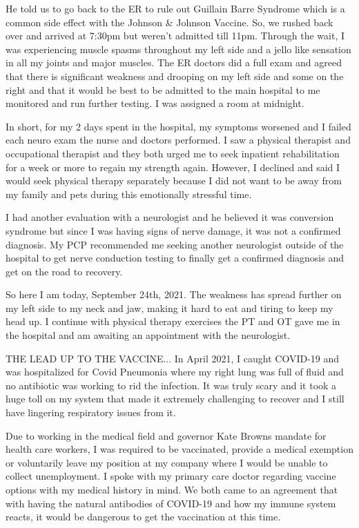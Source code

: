 He told us to go back to the ER to rule out Guillain Barre Syndrome which is a
common side effect with the Johnson \& Johnson Vaccine. So, we rushed back over
and arrived at 7:30pm but weren’t admitted till 11pm. Through the wait, I was
experiencing muscle spasms throughout my left side and a jello like sensation in
all my joints and major muscles. The ER doctors did a full exam and agreed that
there is significant weakness and drooping on my left side and some on the right
and that it would be best to be admitted to the main hospital to me monitored
and run further testing. I was assigned a room at midnight.

In short, for my 2 days spent in the hospital, my symptoms worsened and I failed
each neuro exam the nurse and doctors performed. I saw a physical therapist and
occupational therapist and they both urged me to seek inpatient rehabilitation
for a week or more to regain my strength again. However, I declined and said I
would seek physical therapy separately because I did not want to be away from my
family and pets during this emotionally stressful time.

I had another evaluation with a neurologist and he believed it was conversion
syndrome but since I was having signs of nerve damage, it was not a confirmed
diagnosis. My PCP recommended me seeking another neurologist outside of the
hospital to get nerve conduction testing to finally get a confirmed diagnosis
and get on the road to recovery.

So here I am today, September 24th, 2021. The weakness has spread further on my
left side to my neck and jaw, making it hard to eat and tiring to keep my head
up. I continue with physical therapy exercises the PT and OT gave me in the
hospital and am awaiting an appointment with the neurologist.

THE LEAD UP TO THE VACCINE... In April 2021, I caught COVID-19 and was
hospitalized for Covid Pneumonia where my right lung was full of fluid and no
antibiotic was working to rid the infection. It was truly scary and it took a
huge toll on my system that made it extremely challenging to recover and I still
have lingering respiratory issues from it.

Due to working in the medical field and governor Kate Browns mandate for health
care workers, I was required to be vaccinated, provide a medical exemption or
voluntarily leave my position at my company where I would be unable to collect
unemployment. I spoke with my primary care doctor regarding vaccine options with
my medical history in mind. We both came to an agreement that with having the
natural antibodies of COVID-19 and how my immune system reacts, it would be
dangerous to get the vaccination at this time.

